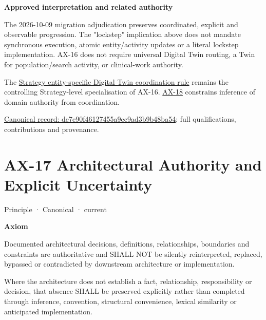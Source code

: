 \par\medskip\textbf{Approved interpretation and related authority}\par


The 2026-10-09 migration adjudication preserves coordinated, explicit and
observable progression. The "lockstep" implication above does not mandate
synchronous execution, atomic entity/activity updates or a literal lockstep
implementation. AX-16 does not require universal Digital Twin routing, a Twin
for population/search activity, or clinical-work authority.



The \href{\detokenize{../../../../../docs/markdown/02-strategy/strategic-views/logical-component-responsibilities.md#entity-specific-operational-coordination}}{Strategy entity-specific Digital Twin coordination rule}
remains the controlling Strategy-level specialisation of AX-16.
\hyperref[element:b8cafe3cf5904d2bb9a9767260fddf78]{AX-18} constrains inference of domain authority from coordination.


{\footnotesize \href{../../../../continuum/motivation/principle/de7e90f46127455a9ec9ad3b9b48ba54.md}{Canonical record: de7e90f46127455a9ec9ad3b9b48ba54}; full qualifications, contributions and provenance.}\par
\section{AX-17 Architectural Authority and Explicit Uncertainty}

\label{element:8882573df7ce43c6bc0f66da0a676139}
{\small Principle · Canonical · current}\par

\par\medskip\textbf{Axiom}\par


Documented architectural decisions, definitions, relationships, boundaries
and constraints are authoritative and SHALL NOT be silently reinterpreted,
replaced, bypassed or contradicted by downstream architecture or
implementation.



Where the architecture does not establish a fact, relationship,
responsibility or decision, that absence SHALL be preserved explicitly
rather than completed through inference, convention, structural
convenience, lexical similarity or anticipated implementation.



